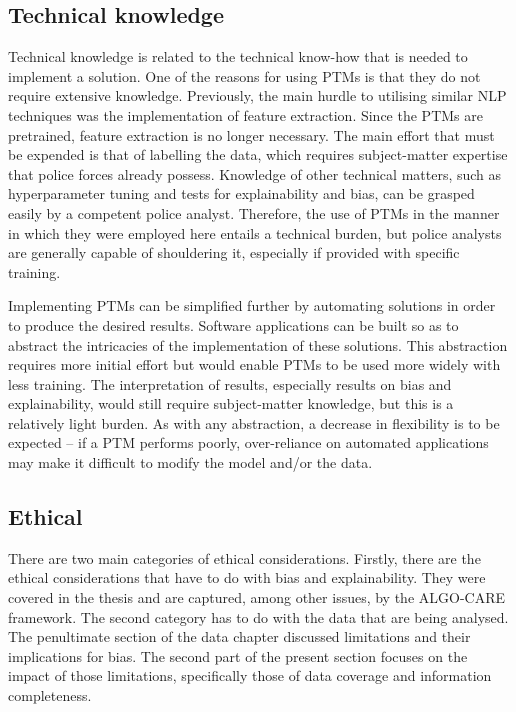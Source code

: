 \subsection{Technical knowledge} Technical knowledge is related to the technical know-how that is needed to implement a solution. One of the reasons for using PTMs is that they do not require extensive knowledge. Previously, the main hurdle to utilising similar NLP techniques was the implementation of feature extraction. Since the PTMs are pretrained, feature extraction is no longer necessary. The main effort that must be expended is that of labelling the data, which requires subject-matter expertise that police forces already possess. Knowledge of other technical matters, such as hyperparameter tuning and tests for explainability and bias, can be grasped easily by a competent police analyst. Therefore, the use of PTMs in the manner in which they were employed here entails a technical burden, but police analysts are generally capable of shouldering it, especially if provided with specific training. 

Implementing PTMs can be simplified further by automating solutions in order to produce the desired results. Software applications can be built so as to abstract the intricacies of the implementation of these solutions. This abstraction requires more initial effort but would enable PTMs to be used more widely with less training. The interpretation of results, especially results on bias and explainability, would still require subject-matter knowledge, but this is a relatively light burden. As with any abstraction, a decrease in flexibility is to be expected – if a PTM performs poorly, over-reliance on automated applications may make it difficult to modify the model and/or the data.

\subsection{Ethical} There are two main categories of ethical considerations. Firstly, there are the ethical considerations that have to do with bias and explainability. They were covered in the thesis and are captured, among other issues, by the ALGO-CARE framework. The second category has to do with the data that are being analysed. The penultimate section of the data chapter discussed limitations and their implications for bias. The second part of the present section focuses on the impact of those limitations, specifically those of data coverage and information completeness.


